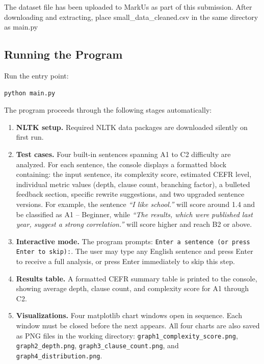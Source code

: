 \documentclass[11pt]{article}
\begin{document}
The dataset file has been uploaded to MarkUs as part of this submission. After downloading and extracting, place small\_data\_cleaned.csv in the same directory as main.py

\subsection*{Running the Program}

Run the entry point:
 
\begin{verbatim}
python main.py
\end{verbatim}
 
The program proceeds through the following stages automatically:
 
\begin{enumerate}
  \item \textbf{NLTK setup.} Required NLTK data packages are downloaded silently on first run.
  \item \textbf{Test cases.} Four built-in sentences spanning A1 to C2 difficulty are analyzed. For each sentence, the console displays a formatted block containing: the input sentence, its complexity score, estimated CEFR level, individual metric values (depth, clause count, branching factor), a bulleted feedback section, specific rewrite suggestions, and two upgraded sentence versions. For example, the sentence \textit{``I like school.''} will score around 1.4 and be classified as A1 -- Beginner, while \textit{``The results, which were published last year, suggest a strong correlation.''} will score higher and reach B2 or above.
  \item \textbf{Interactive mode.} The program prompts: \texttt{Enter a sentence (or press Enter to skip):}. The user may type any English sentence and press Enter to receive a full analysis, or press Enter immediately to skip this step.
  \item \textbf{Results table.} A formatted CEFR summary table is printed to the console, showing average depth, clause count, and complexity score for A1 through C2.
  \item \textbf{Visualizations.} Four matplotlib chart windows open in sequence. Each window must be closed before the next appears. All four charts are also saved as PNG files in the working directory: \texttt{graph1\_complexity\_score.png}, \texttt{graph2\_depth.png}, \texttt{graph3\_clause\_count.png}, and \texttt{graph4\_distribution.png}.
\end{enumerate}
 
\end{document}
